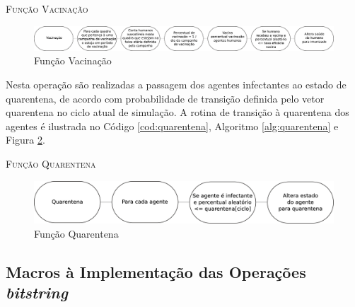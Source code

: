 \begin{algorithm}[H]
 \SetAlgoLined  
 
 \caption{\textsc{Função Vacinação}} 
 \label{alg:vacinacao}
\end{algorithm}

\begin{figure}[H]
  \centering
  \includegraphics[width=1\textwidth]{Figuras/EstruturasDadosEstrategias/Operadores/Vacinacao.eps}
  \caption{Função Vacinação}
  \label{fig:vacinacao}
\end{figure} 


Nesta operação são realizadas a passagem dos agentes infectantes ao estado de quarentena, de acordo com probabilidade de transição definida pelo vetor quarentena no ciclo atual de simulação. A rotina de transição à quarentena dos agentes é ilustrada no Código \ref{cod:quarentena}, Algoritmo \ref{alg:quarentena} e Figura \ref{fig:quarentena}. 



\begin{algorithm}[H]
 \SetAlgoLined  
 
 \caption{\textsc{Função Quarentena}} 
 \label{alg:quarentena}
\end{algorithm}

\begin{figure}[H]
  \centering
  \includegraphics[width=1\textwidth]{Figuras/EstruturasDadosEstrategias/Operadores/Quarentena.eps}
  \caption{Função Quarentena}
  \label{fig:quarentena}
\end{figure} 

\newpage

\subsection{Macros à Implementação das Operações \textit{bitstring}}

